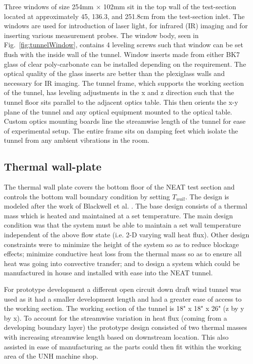 Three windows of size 254mm $\times$ 102mm sit in the top wall of the test-section located at approximately 45, 136.3, and 251.8cm from the test-section inlet.
The windows are used for introduction of laser light, for infrared (IR) imaging and for inserting various measurement probes.
The window body, seen in Fig.~\ref{fig:tunnelWindow}, contains 4 leveling screws such that window can be set flush with the inside wall of the tunnel.
Window inserts made from either BK7 glass of clear poly-carbonate can be installed depending on the requirement.
The optical quality of the glass inserts are better than the plexiglass walls and necessary for IR imaging.
The tunnel frame, which supports the working section of the tunnel, has leveling adjustments in the x and z direction such that the tunnel floor sits parallel to the adjacent optics table. 
This then orients the x-y plane of the tunnel and any optical equipment mounted to the optical table.
Custom optics mounting boards line the streamwise length of the tunnel for ease of experimental setup.
The entire frame sits on damping feet which isolate the tunnel from any ambient vibrations in the room.

\subsection{Thermal wall-plate}
The thermal wall plate covers the bottom floor of the NEAT test section and controls the bottom wall boundary condition by setting $T_{wall}$.
The design is modeled after the work of Blackwell et al. \cite{Blackwell1972}.
The base design consists of a thermal mass which is heated and maintained at a set temperature.
The main design condition was that the system must be able to maintain a set wall temperature independent of the above flow state (i.e. 2-D varying wall heat flux).
Other design constraints were to minimize the height of the system so as to reduce blockage effects; minimize conductive heat loss from the thermal mass so as to ensure all heat was going into convective transfer; and to design a system which could be manufactured in house and installed with ease into the NEAT tunnel.

For prototype development a different open circuit down draft wind tunnel was used as it had a smaller development length and had a greater ease of access to the working section.
The working section of the tunnel is 18" x 18" x 26" (z by y by x).
To account for the streamwise variation in heat flux (coming from a developing boundary layer) the prototype design consisted of two thermal masses with increasing streamwise length based on downstream location.
This also assisted in ease of manufacturing as the parts could then fit within the working area of the UNH machine shop.\\

